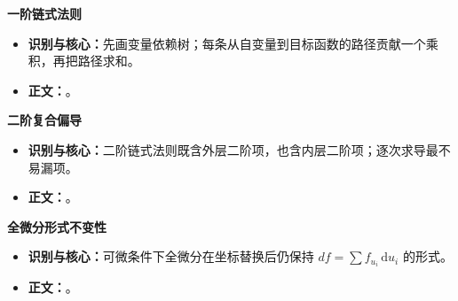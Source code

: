 \begin{knowledgeBox}
\textbf{一阶链式法则}

\begin{itemize}
  \item \textbf{识别与核心：}先画变量依赖树；每条从自变量到目标函数的路径贡献一个乘积，再把路径求和。
  \item \textbf{正文：}。
\end{itemize}

\textbf{二阶复合偏导}

\begin{itemize}
  \item \textbf{识别与核心：}二阶链式法则既含外层二阶项，也含内层二阶项；逐次求导最不易漏项。
  \item \textbf{正文：}。
\end{itemize}

\textbf{全微分形式不变性}

\begin{itemize}
  \item \textbf{识别与核心：}可微条件下全微分在坐标替换后仍保持 \(df=\sum f_{u_i}\,\mathrm du_i\) 的形式。
  \item \textbf{正文：}。
\end{itemize}

\end{knowledgeBox}
